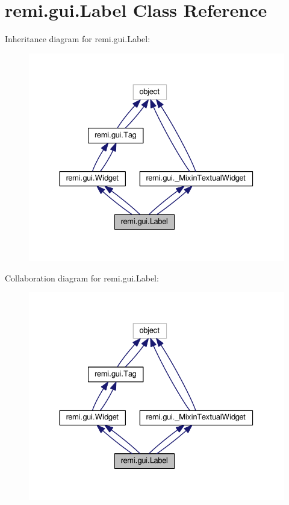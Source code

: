 \hypertarget{classremi_1_1gui_1_1Label}{}\section{remi.\+gui.\+Label Class Reference}
\label{classremi_1_1gui_1_1Label}


Inheritance diagram for remi.\+gui.\+Label\+:
\nopagebreak
\begin{figure}[H]
\begin{center}
\leavevmode
\includegraphics[width=330pt]{d9/d34/classremi_1_1gui_1_1Label__inherit__graph}
\end{center}
\end{figure}


Collaboration diagram for remi.\+gui.\+Label\+:
\nopagebreak
\begin{figure}[H]
\begin{center}
\leavevmode
\includegraphics[width=330pt]{de/d4e/classremi_1_1gui_1_1Label__coll__graph}
\end{center}
\end{figure}

